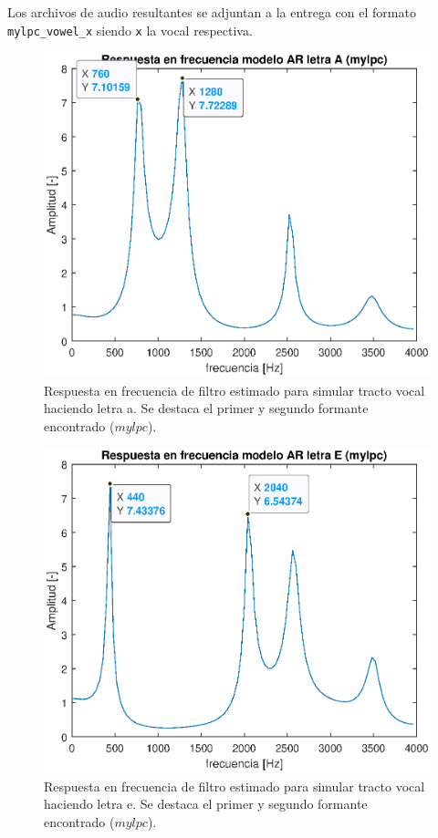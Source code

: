 Los archivos de audio resultantes se adjuntan a la entrega con el formato \texttt{mylpc\_vowel\_x} siendo \texttt{x} la vocal respectiva.

\begin{figure}[H]
    \centering
    \includegraphics[width = .8\linewidth]{figures/p1_4a.eps}
    \caption{Respuesta en frecuencia de filtro estimado para simular tracto vocal haciendo letra a. Se destaca el primer y segundo formante encontrado ($mylpc$).}
    \label{fig:p1_4a}
\end{figure}

\begin{figure}[H]
    \centering
    \includegraphics[width = .8\linewidth]{figures/p1_4e.eps}
    \caption{Respuesta en frecuencia de filtro estimado para simular tracto vocal haciendo letra e. Se destaca el primer y segundo formante encontrado ($mylpc$).}
    \label{fig:p1_4e}
\end{figure}

